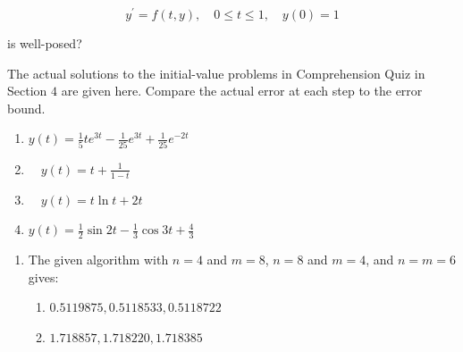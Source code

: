 \begin{posttest}[\textcolor{red}{End of Module 6 Quiz}]
\begin{enumerate}[label=\roman*.]
$$
y^{\prime}=f(t, y), \quad 0 \leq t \leq 1, \quad y(0)=1
$$

is well-posed?
\end{enumerate}
\item The actual solutions to the initial-value problems in Comprehension Quiz in Section $4$ are given here. Compare the actual error at each step to the error bound.
\begin{enumerate}[label=\roman*.]
\item $y(t)=\frac{1}{5} t e^{3 t}-\frac{1}{25} e^{3 t}+\frac{1}{25} e^{-2 t}$\\
\item $\quad y(t)=t+\frac{1}{1-t}$\\
\item $\quad y(t)=t \ln t+2 t$\\
\item $y(t)=\frac{1}{2} \sin 2 t-\frac{1}{3} \cos 3 t+\frac{4}{3}$
\end{enumerate}

\begin{mysolution}
 \begin{enumerate}[label=\arabic*.]
\item The given algorithm with $n = 4$ and $m = 8$, $n = 8$ and $m = 4$, and $n = m = 6$ gives:
\begin{enumerate}[label=(\alph*)]
\item $0.5119875, 0.5118533, 0.5118722$
\item $1.718857, 1.718220, 1.718385$
\end{enumerate}


\end{enumerate}
\end{mysolution}
\end{posttest}
